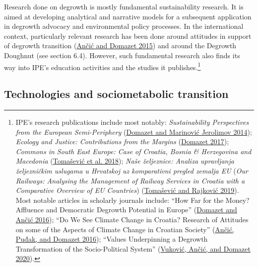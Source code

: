 \documentclass[a4paper, nobind]{templates/ociamthesis}
\begin{document}
Research done on degrowth is mostly fundamental sustainability research. It is aimed at developing analytical and narrative models for a subsequent application in degrowth advocacy and environmental policy processes. In the international context, particularly relevant research has been done around attitudes in support of degrowth transition (\protect\hyperlink{ref-ancic_potential_2015}{Ančić and Domazet 2015}) and around the Degrowth Doughnut (see section 6.4). However, such fundamental research also finds its way into IPE's education activities and the studies it publishes.\footnote{IPE's research publications include most notably: \emph{Sustainability Perspectives from the European Semi-Periphery} (\protect\hyperlink{ref-domazet_sustainability_2014}{Domazet and Marinović Jerolimov 2014}); \emph{Ecology and Justice: Contributions from the Margins} (\protect\hyperlink{ref-domazet_ecology_2017}{Domazet 2017}); \emph{Commons in South East Europe: Case of Croatia, Bosnia \& Herzegovina and Macedonia} (\protect\hyperlink{ref-tomasevic_commons_2018}{Tomašević et al. 2018}); \emph{Naše željeznice: Analiza upravljanja željezničkim uslugama u Hrvatskoj uz komparativni pregled zemalja EU} (\emph{Our Railways: Analysing the Management of Railway Services in Croatia with a Comparative Overview of EU Countries}) (\protect\hyperlink{ref-tomasevic_nase_2019}{Tomašević and Rajković 2019}). Most notable articles in scholarly journals include: ``How Far for the Money? Affluence and Democratic Degrowth Potential in Europe'' (\protect\hyperlink{ref-domazet_how_2016}{Domazet and Ančić 2016}); ``Do We See Climate Change in Croatia? Research of Attitudes on some of the Aspects of Climate Change in Croatian Society'' (\protect\hyperlink{ref-ancic_we_2016}{Ančić, Puđak, and Domazet 2016}); ``Values Underpinning a Degrowth Transformation of the Socio-Political System'' (\protect\hyperlink{ref-vukovic_values_2020}{Vuković, Ančić, and Domazet 2020}).}

\hypertarget{technologies-and-sociometabolic-transition}{%
\subsection{Technologies and sociometabolic transition}\label{technologies-and-sociometabolic-transition}}
\end{document}
